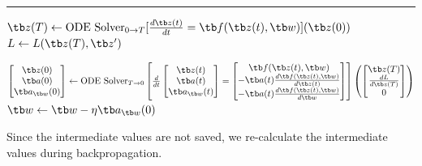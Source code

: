 \documentclass{article}
\begin{document}
        \begin{algorithm}[H]
            \DontPrintSemicolon

            \caption{Neural ODE training algorithm}


            \BlankLine
            \hrule
            $\tb z(T) \leftarrow \text{ODE Solver}_{0 \to T}[\frac{{d\tb z(t)}}{dt} = \tb f(\tb z(t),\tb w)](\tb z(0))$\;
            $L \leftarrow L(\tb z(T), \tb z')$\;

            $\begin{bmatrix}
                \tb z(0) \\
                \tb a(0) \\
                \tb a_{\tb w}(0)
            \end{bmatrix}
            \leftarrow \text{ODE Solver}_{T \to 0}\left[
                \frac{d}{dt}\begin{bmatrix} \tb z(t) \\ \tb a(t) \\ \tb a_{\tb w}(t) \end{bmatrix}
                = \begin{bmatrix} \tb f(\tb z(t), \tb w ) \\ -\tb a(t)\frac{d\tb f(\tb z(t), \tb w)}{d\tb z(t)} \\ -\tb a(t)\frac{d\tb f(\tb z(t),\tb w)}{d\tb w}\end{bmatrix}
                \right]\left(\begin{bmatrix} \tb z(T) \\ \frac{dL}{d\tb z(T)} \\ 0 \end{bmatrix}\right)$\;
            $\tb w \leftarrow \tb w - \eta \tb a_{\tb w}(0)$\;
        \end{algorithm}

        Since the intermediate values are not saved, we re-calculate the intermediate values during backpropagation.
\end{document}
